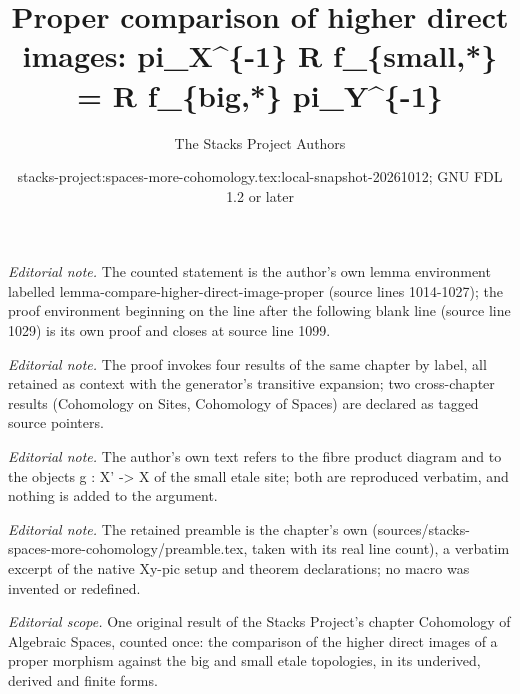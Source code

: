\documentclass{stacks-project}
\title{Proper comparison of higher direct images: pi\_X\textasciicircum{}\{-1\} R f\_\{small,*\} = R f\_\{big,*\} pi\_Y\textasciicircum{}\{-1\}}
\author{The Stacks Project Authors}
\date{stacks-project:spaces-more-cohomology.tex:local-snapshot-20261012; GNU FDL 1.2 or later}
\theoremstyle{plain}
\theoremstyle{definition}
\theoremstyle{remark}
\numberwithin{equation}{subsection}
\begin{document}
\maketitle
\noindent\textit{Editorial note.} The counted statement is the author's own lemma environment labelled lemma-compare-higher-direct-image-proper (source lines 1014-1027); the proof environment beginning on the line after the following blank line (source line 1029) is its own proof and closes at source line 1099.\par\medskip
\noindent\textit{Editorial note.} The proof invokes four results of the same chapter by label, all retained as context with the generator's transitive expansion; two cross-chapter results (Cohomology on Sites, Cohomology of Spaces) are declared as tagged source pointers.\par\medskip
\noindent\textit{Editorial note.} The author's own text refers to the fibre product diagram and to the objects g : X' -> X of the small etale site; both are reproduced verbatim, and nothing is added to the argument.\par\medskip
\noindent\textit{Editorial note.} The retained preamble is the chapter's own (sources/stacks-spaces-more-cohomology/preamble.tex, taken with its real line count), a verbatim excerpt of the native Xy-pic setup and theorem declarations; no macro was invented or redefined.\par\medskip
\noindent\textit{Editorial scope.} One original result of the Stacks Project's chapter Cohomology of Algebraic Spaces, counted once: the comparison of the higher direct images of a proper morphism against the big and small etale topologies, in its underived, derived and finite forms.\par\medskip
\end{document}

